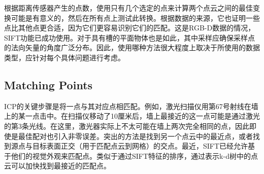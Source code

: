 
根据距离传感器产生的点数，使用只有几个选定的点来计算两个点云之间的最佳变换可能是有意义的，然后在所有点上测试此转换。根据数据的来源，它也证明一些点比其他点更合适，因为它们更容易识别它们的匹配。这是RGB-D数据的情况，SIFT功能已成功使用。对于具有槽的平面物体也是如此，其中采样应确保采样点的法向矢量的角度广泛分布。因此，使用哪种方法很大程度上取决于所使用的数据类型，应针对每个具体问题进行考虑。


\subsection{Matching Points}
ICP的关键步骤是将一点与其对应点相匹配。例如，激光扫描仪用第67号射线在墙上的某一点击中。在扫描仪移动了10厘米后，墙上最接近的这一点可能是通过激光的第3条光线。在这里，激光器实际上不太可能在墙上两次完全相同的点，因此即使是最佳配对也引入非零误差。突出的方法是找到另一个点云中的最近点，或者找到源点与目标表面正交（用于匹配点云到网格）的交点。最近，SIFT已经允许基于他们的视觉外观来匹配点。类似于通过SIFT特征的排序，通过表示k-d树中的点云可以加快找到最接近的匹配点。

